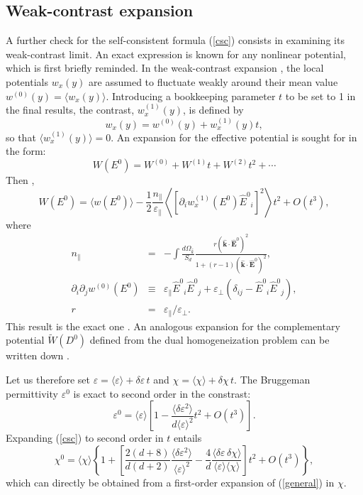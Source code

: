\subsection{Weak-contrast expansion}
A further check for the self-consistent formula (\ref{csc}) consists 
in examining its weak-contrast limit. An exact expression is known 
for any nonlinear potential, which is first briefly reminded. In 
the weak-contrast expansion \cite{BLUM89,PONT92,PONT97,BART98}, 
the local potentials $w_x(y)$ are assumed to fluctuate weakly 
around their mean value $w^{(0)}(y)=\langle w_x(y)\rangle$. 
Introducing a bookkeeping parameter $t$ to be set to 1 in the 
final results, the contrast, $w^{(1)}_x(y)$, is defined by
\begin{equation}
w_x(y)=w^{(0)}(y)+w^{(1)}_x(y)t,
\end{equation}
so that $\langle w^{(1)}_x(y)\rangle=0$. An expansion for the 
effective potential is sought for in the form:
\begin{equation}
W(E^0)=W^{(0)}+W^{(1)}t+W^{(2)}t^2+\cdots
\end{equation}
Then \cite{PONT97}, 
\begin{equation}
\label{general}
W(E^0)=\langle w(E^0)\rangle-\frac{1}{2}\frac{n_\parallel}
{\varepsilon_\parallel}\left\langle\left[\partial_i w_x^{(1)}
(E^0) {\hat E^0}_i\right]^2\right\rangle t^2+ O(t^3),
\end{equation}
where
\begin{eqnarray}
\label{depol}
n_\parallel&=&-\int \frac{d\Omega_{\hat k}}{S_d}
\frac{r ({\mathbf\hat k}\cdot{\mathbf\hat E}^0)^2}
{1+(r-1)({\mathbf\hat k}\cdot{\mathbf\hat E}^0)^2},\\
\partial_i\partial_j w^{(0)}(E^0)&\equiv&
\varepsilon_\parallel {\hat E^0}_i{\hat E^0}_j
+\varepsilon_\perp(\delta_{ij}-{\hat E^0}_i{\hat E^0}_j),\\
r&=&\varepsilon_\parallel/\varepsilon_\perp.
\end{eqnarray}
This result is the exact one \cite{PONT97}. An analogous 
expansion for the complementary potential $\tilde{W}(D^0)$ 
defined from the dual homogeneization problem can be written 
down \cite{PONT97,BART98}.

Let us therefore set $\varepsilon=\langle \varepsilon\rangle
+\delta\varepsilon\, t$ and $\chi=\langle \chi\rangle+
\delta\chi\,t$. The Bruggeman permittivity $\varepsilon^0$ 
is exact to second order in the constrast:
\begin{equation}
\varepsilon^0=\langle \varepsilon\rangle
\left[1-\frac{\langle\delta\varepsilon^2\rangle}
{d\langle\varepsilon\rangle^2}t^2+O(t^3)\right].
\end{equation}
Expanding (\ref{csc}) to second order in $t$ entails 
\cite{BART98}
\begin{equation}
\label{wnlwc}
\chi^0=\langle\chi\rangle
\left\{1+\left[\frac{2(d+8)}{d(d+2)}
\frac{\langle\delta\varepsilon^2\rangle}
{\langle\varepsilon\rangle^2}-\frac{4}{d}
\frac{\langle\delta\varepsilon\,\delta\chi\rangle}
{\langle\varepsilon\rangle\langle\chi\rangle}\right]t^2
+O(t^3)\right\},
\end{equation}
which can directly be obtained from a first-order 
expansion of (\ref{general}) in $\chi$.

